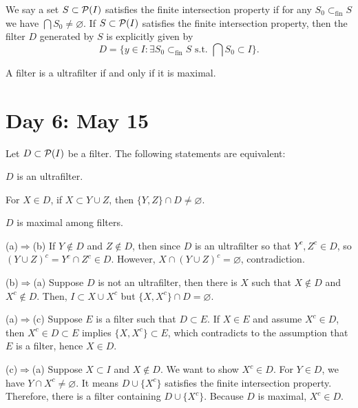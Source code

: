\documentclass{../../small}
\begin{document}
\begin{defn*}
We say a set $S\subset\mathcal{P}(I)$ satisfies the finite intersection property if for any $S_0\subset_{\mathrm{fin}}S$ we have $\bigcap S_0\ne\varnothing$.
If $S\subset\mathcal{P}(I)$ satisfies the finite intersection property, then the filter $D$ generated by $S$ is explicitly given by
\[D=\{y\in I:\exists S_0\subset_{\mathrm{fin}}S\text{ s.t.~}\bigcap S_0\subset I\}.\]
\end{defn*}

\begin{lem*}
A filter is a ultrafilter if and only if it is maximal.
\end{lem*}


\newpage
\section{Day 6: May 15}

\begin{thm*}
Let $D\subset\mathcal{P}(I)$ be a filter.
The following statements are equivalent:
\begin{parts}
\item $D$ is an ultrafilter.
\item For $X\in D$, if $X\subset Y\cup Z$, then $\{Y,Z\}\cap D\ne\varnothing$.
\item $D$ is maximal among filters.
\end{parts}
\end{thm*}
\begin{pf}
(a)$\Rightarrow$(b)
If $Y\notin D$ and $Z\notin D$, then since $D$ is an ultrafilter so that $Y^c,Z^c\in D$, so $(Y\cup Z)^c=Y^c\cap Z^c\in D$.
However, $X\cap(Y\cup Z)^c=\varnothing$, contradiction.

(b)$\Rightarrow$(a)
Suppose $D$ is not an ultrafilter, then there is $X$ such that $X\notin D$ and $X^c\notin D$.
Then, $I\subset X\cup X^c$ but $\{X,X^c\}\cap D=\varnothing$.

(a)$\Rightarrow$(c)
Suppose $E$ is a filter such that $D\subset E$.
If $X\in E$ and assume $X^c\in D$, then $X^c\in D\subset E$ implies $\{X,X^c\}\subset E$, which contradicts to the assumption that $E$ is a filter, hence $X\in D$.

(c)$\Rightarrow$(a)
Suppose $X\subset I$ and $X\notin D$.
We want to show $X^c\in D$.
For $Y\in D$, we have $Y\cap X^c\ne\varnothing$.
It means $D\cup\{X^c\}$ satisfies the finite intersection property.
Therefore, there is a filter containing $D\cup\{X^c\}$.
Because $D$ is maximal, $X^c\in D$.
\end{pf}
\end{document}
